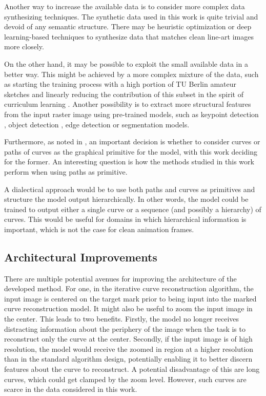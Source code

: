 Another way to increase the available data is to consider more complex data synthesizing techniques. The synthetic data used in this work is quite trivial and devoid of any semantic structure. There may be heuristic optimization or deep learning-based techniques to synthesize data that matches clean line-art images more closely.

On the other hand, it may be possible to exploit the small available data in a better way. This might be achieved by a more complex mixture of the data, such as starting the training process with a high portion of TU Berlin amateur sketches and linearly reducing the contribution of this subset in the spirit of curriculum learning \citep{10.1145/1553374.1553380}. Another possibility is to extract more structural features from the input raster image using pre-trained models, such as keypoint detection \citep{Puhachov2021KeypointPolyvector}, object detection \citep{yolov5}, edge detection \citep{xsoria2020dexined} or segmentation \citep{yaas} models.

Furthermore, as noted in , an important decision is whether to consider curves or paths of curves as the graphical primitive for the model, with this work deciding for the former. An interesting question is how the methods studied in this work perform when using paths as primitive.

A dialectical approach would be to use both paths and curves as primitives and structure the model output hierarchically. In other words, the model could be trained to output either a single curve or a sequence (and possibly a hierarchy) of curves. This would be useful for domains in which hierarchical information is important, which is not the case for clean animation frames.

\subsection{Architectural Improvements}
\label{subsec:future.method.architecture}

There are multiple potential avenues for improving the architecture of the developed method. For one, in the iterative curve reconstruction algorithm, the input image is centered on the target mark prior to being input into the marked curve reconstruction model. It might also be useful to zoom the input image in the center. This leads to two benefits. Firstly, the model no longer receives distracting information about the periphery of the image when the task is to reconstruct only the curve at the center. Secondly, if the input image is of high resolution, the model would receive the zoomed in region at a higher resolution than in the standard algorithm design, potentially enabling it to better discern features about the curve to reconstruct. A potential disadvantage of this are long curves, which could get clamped by the zoom level. However, such curves are scarce in the data considered in this work.

